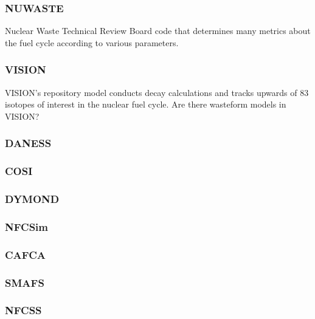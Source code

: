 \subsubsection{NUWASTE} Nuclear Waste Technical Review Board code that determines many metrics about 
the fuel cycle according to various parameters. \cite{NuwastePres} 

\subsubsection{VISION}
VISION's repository model conducts decay calculations and tracks upwards of 83 isotopes of interest 
in the nuclear fuel cycle. \cite{VISION} Are there wasteform models in VISION?
\subsubsection{DANESS}
\subsubsection{COSI}
\subsubsection{DYMOND}
\subsubsection{NFCSim}
\subsubsection{CAFCA}
\subsubsection{SMAFS}
\subsubsection{NFCSS}
